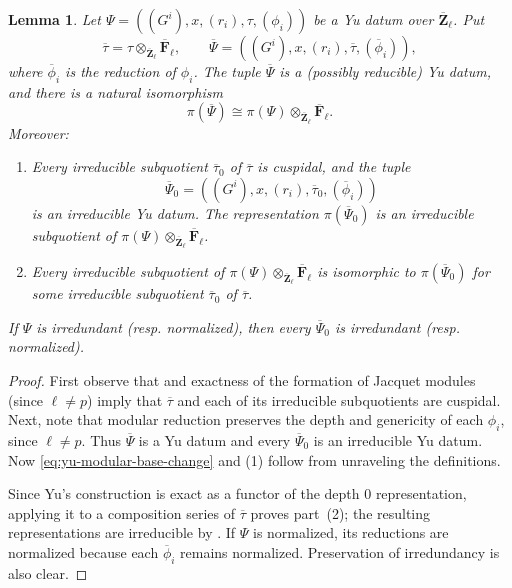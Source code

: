 \documentclass[reqno]{amsart}
\numberwithin{equation}{subsection}
\newcommand{\F}{\mathbf{F}}
\newcommand{\Z}{\mathbf{Z}}
\newcommand{\ol}[1]{\overline{#1}}
\newtheorem{lemma}[thm]{Lemma}
\theoremstyle{remark}
\numberwithin{equation}{subsection}
\numberwithin{figure}{subsection}
\begin{document}
\begin{lemma}\label{lemma:yu-datum-modular-reduction}
Let $\Psi=((G^i),x,(r_i),\tau,(\phi_i))$ be a Yu datum over $\ol\Z_\ell$. Put
\[
    \ol\tau=\tau\otimes_{\ol\Z_\ell}\ol\F_\ell,
    \qquad
    \ol\Psi=((G^i),x,(r_i),\ol\tau,(\ol\phi_i)),
\]
where $\ol\phi_i$ is the reduction of $\phi_i$. The tuple $\ol\Psi$ is a (possibly reducible) Yu datum, and there is a natural isomorphism
\begin{equation}\label{eq:yu-modular-base-change}
    \pi(\ol\Psi)\cong
    \pi(\Psi)\otimes_{\ol\Z_\ell}\ol\F_\ell.
\end{equation}
Moreover:
\begin{enumerate}
    \item Every irreducible subquotient $\ol\tau_0$ of $\ol\tau$ is cuspidal, and the tuple
    \[
    \ol\Psi_0=((G^i),x,(r_i),\ol\tau_0,(\ol\phi_i))
    \]
    is an irreducible Yu datum. The representation $\pi(\ol\Psi_0)$ is an irreducible subquotient of $\pi(\Psi)\otimes_{\ol\Z_\ell}\ol\F_\ell$.
    \item Every irreducible subquotient of $\pi(\Psi)\otimes_{\ol\Z_\ell}\ol\F_\ell$ is isomorphic to $\pi(\ol\Psi_0)$ for some irreducible subquotient $\ol\tau_0$ of $\ol\tau$.
\end{enumerate}
If $\Psi$ is irredundant (resp. normalized), then every $\ol\Psi_0$ is irredundant (resp. normalized).
\end{lemma}

\begin{proof}
First observe that \cite[Lemma~2.10.1]{Cot26b} and exactness of the formation of Jacquet modules (since $\ell \neq p$) imply that $\ol\tau$ and each of its irreducible subquotients are cuspidal. Next, note that modular reduction preserves the depth and genericity of each $\phi_i$, since $\ell \neq p$. Thus $\ol\Psi$ is a Yu datum and every $\ol\Psi_0$ is an irreducible Yu datum. Now \eqref{eq:yu-modular-base-change} and (1) follow from unraveling the definitions. 

Since Yu's construction is exact as a functor of the depth $0$ representation, applying it to a composition series of $\ol\tau$ proves part~(2); the resulting representations are irreducible by \cite[Theorem~3.1]{Fin22}. If $\Psi$ is normalized, its reductions are normalized because each $\ol\phi_i$ remains normalized. Preservation of irredundancy is also clear. 
\end{proof}
\end{document}
